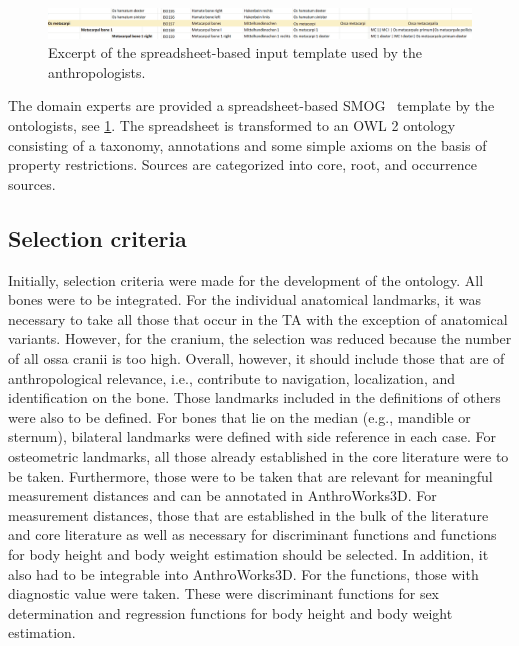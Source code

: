 \documentclass[sw]{iosart2x}
\newcommand{\aw}{AnthroWorks3D}
\begin{document}
\begin{figure}[h]
\includegraphics[width=\textwidth]{img/smog.png}
\caption{Excerpt of the spreadsheet-based input template used by the anthropologists.}\label{fig:smog}
\end{figure}
The domain experts are provided a spreadsheet-based SMOG~\citep{smog} template by the ontologists, see \cref{fig:smog}.
The spreadsheet is transformed to an OWL 2 ontology consisting of a taxonomy, annotations and some simple axioms on the basis of property restrictions.
Sources are categorized into core, root, and occurrence sources.

\subsection{Selection criteria}
Initially, selection criteria were made for the development of the ontology.
All bones were to be integrated.
For the individual anatomical landmarks, it was necessary to take all those that occur in the TA with the exception of anatomical variants.
However, for the cranium, the selection was reduced because the number of all ossa cranii is too high.
Overall, however, it should include those that are of anthropological relevance, i.e., contribute to navigation, localization, and identification on the bone.
Those landmarks included in the definitions of others were also to be defined.
For bones that lie on the median (e.g., mandible or sternum), bilateral landmarks were defined with side reference in each case.
For osteometric landmarks, all those already established in the core literature were to be taken.
Furthermore, those were to be taken that are relevant for meaningful measurement distances and can be annotated in \aw{}.
For measurement distances, those that are established in the bulk of the literature and core literature as well as necessary for discriminant functions and functions for body height and body weight estimation should be selected.
In addition, it also had to be integrable into \aw{}.
For the functions, those with diagnostic value were taken.
These were discriminant functions for sex determination and regression functions for body height and body weight estimation.
\end{document}
